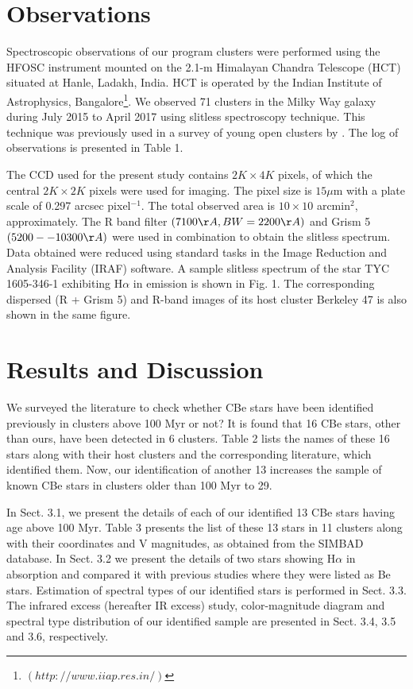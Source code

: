 \documentclass{jaa}
\begin{document}
\section{Observations}
\label{sect:Obs}
Spectroscopic observations of our program clusters were performed using the HFOSC instrument mounted on the 2.1-m Himalayan Chandra Telescope (HCT) situated at Hanle, Ladakh, India. HCT is operated by the Indian Institute of Astrophysics, Bangalore\footnote{$(http://www.iiap.res.in/)$}. We observed 71 clusters in the Milky Way galaxy during July 2015 to April 2017 using slitless spectroscopy technique. This technique was previously used in a survey of young open clusters by \cite{2008Mathew}. The log of observations is presented in Table 1.

The CCD used for the present study contains $2K \times 4K$ pixels, of which the central $2K \times 2K$ pixels were used for imaging. The pixel size is $15\mu$m with a plate scale of 0.297 arcsec pixel$^{-1}$. The total observed area is $10 \times 10$ arcmin$^2$, approximately. The R band filter $(7100 \AA, BW=2200 \AA)$ and Grism 5 $(5200--10300 \AA)$ were used in combination to obtain the slitless spectrum. Data obtained were reduced using standard tasks in the Image Reduction and Analysis Facility (IRAF) software. A sample slitless spectrum of the star TYC 1605-346-1 exhibiting H$\alpha$ in emission is shown in Fig. 1. The corresponding dispersed (R + Grism 5) and R-band images of its host cluster Berkeley 47 is also shown in the same figure.

\section{Results and Discussion}
We surveyed the literature to check whether CBe stars have been identified previously in clusters above 100 Myr or not? It is found that 16 CBe stars, other than ours, have been detected in 6 clusters. Table 2 lists the names of these 16 stars along with their host clusters and the corresponding literature, which identified them. Now, our identification of another 13 increases the sample of known CBe stars in clusters older than 100 Myr to 29.

In Sect. 3.1, we present the details of each of our identified 13 CBe stars having age above 100 Myr. Table 3 presents the list of these 13 stars in 11 clusters along with their coordinates and V magnitudes, as obtained from the SIMBAD database. In Sect. 3.2 we present the details of two stars showing H$\alpha$ in absorption and compared it with previous studies where they were listed as Be stars. Estimation of spectral types of our identified stars is performed in Sect. 3.3. The infrared excess (hereafter IR excess) study, color-magnitude diagram and spectral type distribution of our identified sample are presented in Sect. 3.4, 3.5 and 3.6, respectively.
\end{document}
